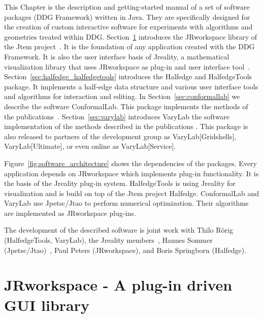 This Chapter is the description and getting-started manual of a set of software packages
(DDG Framework) written in Java. They are specifically designed for the creation of
custom interactive software for experiments with algorithms and geometries treated 
within DDG. Section~\ref{sec:jrworkspace} introduces the {\sc JRworkspace} library of the 
{\sc Jtem} project~\cite{JtemWebsite}. It is the foundation of any application created with 
the DDG Framework. It is also the user interface basis of {\sc Jreality}, a mathematical 
visualization library that uses {\sc JRworkspace} as plug-in and user interface 
tool~\cite{JrealityWebsite}. Section~\ref{sec:halfedge_halfedgetools} introduces the 
{\sc Halfedge} and {\sc HalfedgeTools} package. It implements a half-edge data 
structure and various user interface tools and algorithms for interaction and editing.  
In Section~\ref{sec:conformallab} we describe the software 
{\sc ConformalLab}. This package implements the methods of the 
publications~\cite{Bobenko2010, OWR2012, Sechelmann2012, BobSechSpr}.
Section~\ref{sec:varylab} introduces {\sc VaryLab} the software implementation of the 
methods described in the publications \cite{Lafuente2011, Lafuente2012, Sechelmann2012}.
This package is also released to partners of the development group as 
{\sc VaryLab[Gridshells]}, {\sc VaryLab[Ultimate]}, or even online as {\sc VaryLab[Service]}.



Figure~\ref{fig:software_architecture} shows the dependencies of the packages. Every
application depends on {\sc JRworkspace} which implements plug-in functionality. It is
the basis of the {\sc Jreality} plug-in system. {\sc Half\-edge\-Tools} is using {\sc Jreality} 
for visualization and is build on top of the {\sc Jtem} project {\sc Half\-edge}. 
{\sc ConformalLab} and {\sc VaryLab} use {\sc Jpetsc/Jtao} to perform numerical
optimization. Their algorithms are implemented as {\sc JRworkspace} plug-ins.


The development of the described software is joint work with Thilo R{\" o}rig 
({\sc HalfedgeTools, VaryLab}), the {\sc Jreality} members~\cite{JrealityWebsite}, Hannes 
Sommer ({\sc Jpetsc/Jtao})~\cite{jpetsctao-web-page}, Paul Peters ({\sc JRworkspace}), and 
Boris Springborn ({\sc Halfedge}).



\section{{\sc JRworkspace} - A plug-in driven GUI library}
\label{sec:jrworkspace}



